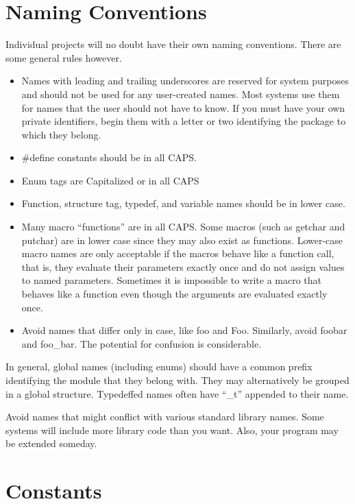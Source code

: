 \section{Naming Conventions}

 Individual projects will no doubt have their own naming conventions. There are
some general rules however.
\begin{itemize}
\item Names with leading and trailing underscores are reserved for system
purposes and should not be used for any user-created names. Most systems use
them for names that the user should not have to know. If you must have your
own private identifiers, begin them with a letter or two identifying the
package to which they belong.

\item \#define constants should be in all CAPS. 

\item Enum tags are Capitalized or in all CAPS 

\item Function, structure tag, typedef, and variable names should be in lower
case. 

\item Many macro ``functions'' are in all CAPS. Some macros (such as getchar and
putchar)  are in lower case since they may also exist as functions. Lower-case
macro names are
only acceptable if the macros behave like a function call, that is, they
evaluate their parameters exactly once and do not assign values to named
parameters. Sometimes it is impossible to write a macro that behaves like a
function even though the arguments are evaluated exactly once.

\item Avoid names that differ only in case, like foo and Foo. Similarly, avoid
foobar and foo\_bar. The potential for confusion is considerable. 
\end{itemize}

 In general, global names (including enums) should have a common prefix
identifying the module that they belong with. They may alternatively be grouped
in a global structure. Typedeffed names often have ``\_t'' appended to their
name. 

 Avoid names that might conflict with various standard library names. Some
systems will include more library code than you want. Also, your program may be
extended someday. 
\newpage
\section{Constants}

